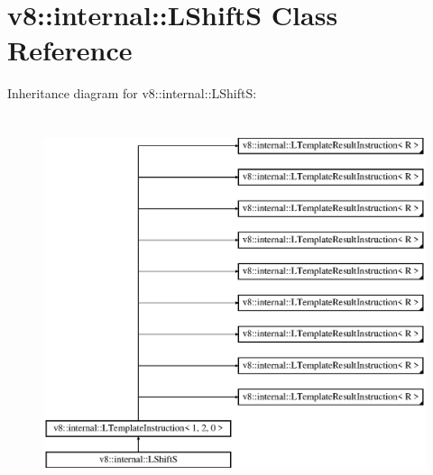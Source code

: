 \hypertarget{classv8_1_1internal_1_1_l_shift_s}{}\section{v8\+:\+:internal\+:\+:L\+ShiftS Class Reference}
\label{classv8_1_1internal_1_1_l_shift_s}
Inheritance diagram for v8\+:\+:internal\+:\+:L\+ShiftS\+:\begin{figure}[H]
\begin{center}
\leavevmode
\includegraphics[height=11.000000cm]{classv8_1_1internal_1_1_l_shift_s}
\end{center}
\end{figure}
